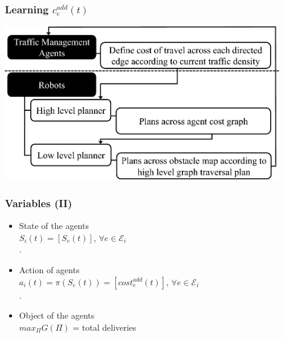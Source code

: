 \documentclass{beamer}
\begin{document}
	\begin{frame}
		\frametitle{Learning $c_e^{add}(t)$}
	    \includegraphics[height=0.9\textheight,width=0.9\textwidth]{learn-model.png}
	\end{frame}
	\begin{frame}
		\frametitle{Variables (II)}
		\begin{itemize}
			\item State of the agents\\ $S_i(t) = [S_e(t)]$, $\forall e \in \mathcal{E}_i$
    \\.

			\item Action of agents\\ $a_i(t) = \pi(S_e(t)) = [cost_e^{add}(t)]$, $\forall e \in \mathcal{E}_i$
\\.

			\item Object of the agents\\ $max_\Pi G(\Pi)$ = total deliveries
			
		\end{itemize}
	\end{frame}
\end{document}
